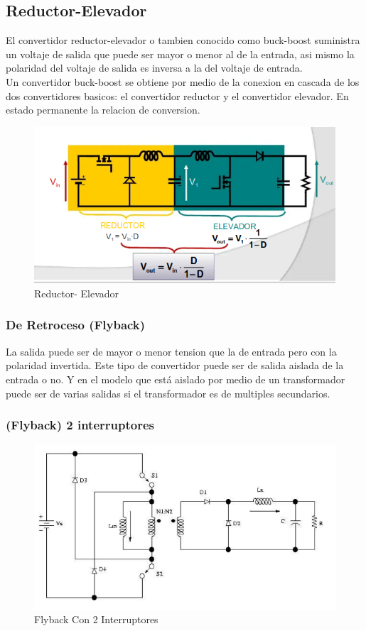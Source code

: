 \documentclass[11pt]{article}
\begin{document}
\subsection{Reductor-Elevador}
El convertidor reductor-elevador o tambien conocido como buck-boost suministra un voltaje de salida que puede ser mayor o menor al de la entrada, asi mismo la polaridad del voltaje de salida es inversa a la del voltaje de entrada.\\Un convertidor buck-boost se obtiene por medio de la conexion en cascada de los dos convertidores basicos: el convertidor reductor y el convertidor elevador. En estado permanente la relacion de conversion.
\begin{figure}[htp]
\centering
\includegraphics[scale=0.60]{Reductor-Elevador.png}
\caption{Reductor- Elevador}
\label{}
\end{figure}
\subsubsection{De Retroceso (Flyback)}
La salida puede ser de mayor o menor tension que la de entrada pero con la polaridad invertida. Este tipo de convertidor puede ser de salida aislada de la entrada o no. Y en el modelo que está aislado por medio de un transformador puede ser de varias salidas si el transformador es de multiples secundarios.
\pagebreak
\subsubsection{(Flyback) 2 interruptores}
\begin{figure}[htp]
\centering
\includegraphics[scale=0.50]{Flyback con 2 interruptores.png}
\caption{Flyback Con 2 Interruptores}
\label{}
\end{figure}
\pagebreak
\end{document}
